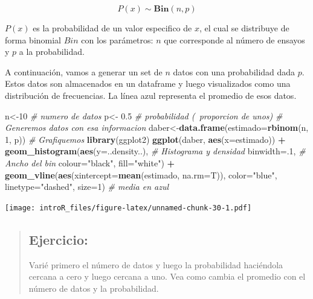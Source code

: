 \documentclass[
]{book}
\newenvironment{Shaded}{\begin{snugshade}}{\end{snugshade}}
\newcommand{\CommentTok}[1]{\textcolor[rgb]{0.56,0.35,0.01}{\textit{#1}}}
\newcommand{\DataTypeTok}[1]{\textcolor[rgb]{0.13,0.29,0.53}{#1}}
\newcommand{\DecValTok}[1]{\textcolor[rgb]{0.00,0.00,0.81}{#1}}
\newcommand{\FloatTok}[1]{\textcolor[rgb]{0.00,0.00,0.81}{#1}}
\newcommand{\KeywordTok}[1]{\textcolor[rgb]{0.13,0.29,0.53}{\textbf{#1}}}
\newcommand{\NormalTok}[1]{#1}
\newcommand{\OperatorTok}[1]{\textcolor[rgb]{0.81,0.36,0.00}{\textbf{#1}}}
\newcommand{\StringTok}[1]{\textcolor[rgb]{0.31,0.60,0.02}{#1}}
\begin{document}
\begin{equation} 
  P\left( x \right) \sim \mathbf{Bin}(n,p)
  \label{eq:binom}
\end{equation}

\(P(x)\) es la probabilidad de un valor especifico de \(x\), el cual se distribuye de forma binomial \(Bin\) con los parámetros: \(n\) que corresponde al número de ensayos y \(p\) a la probabilidad.

A continuación, vamos a generar un set de \(n\) datos con una probabilidad dada \(p\). Estos datos son almacenados en un dataframe y luego visualizados como una distribución de frecuencias. La línea azul representa el promedio de esos datos.

\begin{Shaded}
\begin{Highlighting}[]
\NormalTok{n<-}\DecValTok{10} \CommentTok{# numero de datos}
\NormalTok{p<-}\StringTok{ }\FloatTok{0.5} \CommentTok{# probabilidad (~proporcion de unos)}
\CommentTok{# Generemos datos con esa informacion }
\NormalTok{daber<-}\KeywordTok{data.frame}\NormalTok{(}\DataTypeTok{estimado=}\KeywordTok{rbinom}\NormalTok{(n, }\DecValTok{1}\NormalTok{, p)) }
\CommentTok{# Grafiquemos }
\KeywordTok{library}\NormalTok{(ggplot2)}
\KeywordTok{ggplot}\NormalTok{(daber, }\KeywordTok{aes}\NormalTok{(}\DataTypeTok{x=}\NormalTok{estimado)) }\OperatorTok{+}\StringTok{ }
\StringTok{    }\KeywordTok{geom_histogram}\NormalTok{(}\KeywordTok{aes}\NormalTok{(}\DataTypeTok{y=}\NormalTok{..density..), }\CommentTok{# Histograma y densidad }
                   \DataTypeTok{binwidth=}\NormalTok{.}\DecValTok{1}\NormalTok{, }\CommentTok{# Ancho del bin}
                   \DataTypeTok{colour=}\StringTok{"black"}\NormalTok{, }\DataTypeTok{fill=}\StringTok{"white"}\NormalTok{) }\OperatorTok{+}\StringTok{ }
\StringTok{        }\KeywordTok{geom_vline}\NormalTok{(}\KeywordTok{aes}\NormalTok{(}\DataTypeTok{xintercept=}\KeywordTok{mean}\NormalTok{(estimado, }\DataTypeTok{na.rm=}\NormalTok{T)), }
          \DataTypeTok{color=}\StringTok{"blue"}\NormalTok{, }\DataTypeTok{linetype=}\StringTok{"dashed"}\NormalTok{, }\DataTypeTok{size=}\DecValTok{1}\NormalTok{) }\CommentTok{# media en azul}
\end{Highlighting}
\end{Shaded}

\texttt{[image: introR\_files/figure-latex/unnamed-chunk-30-1.pdf]}

\begin{quote}
\hypertarget{ejercicio-6}{%
\subsection{Ejercicio:}\label{ejercicio-6}}

Varié primero el número de datos y luego la probabilidad haciéndola cercana a cero y luego cercana a uno. Vea como cambia el promedio con el número de datos y la probabilidad.
\end{quote}
\end{document}
